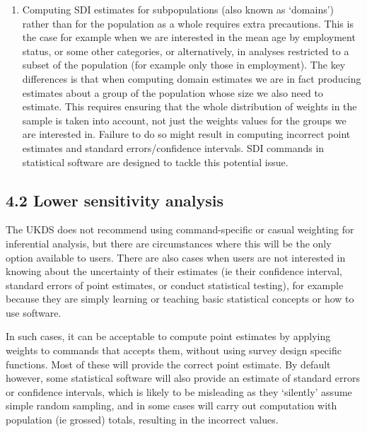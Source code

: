 \documentclass[
  14,
  a4paper,
  DIV=11,
  numbers=noendperiod]{scrartcl}
\providecommand{\tightlist}{%
  \setlength{\itemsep}{0pt}\setlength{\parskip}{0pt}}\usepackage{longtable,booktabs,array}
\begin{document}
\begin{enumerate}
\def\labelenumi{\arabic{enumi}.}
\setcounter{enumi}{3}
\tightlist
\item
  Computing SDI estimates for subpopulations (also known as `domains')
  rather than for the population as a whole requires extra precautions.
  This is the case for example when we are interested in the mean age by
  employment status, or some other categories, or alternatively, in
  analyses restricted to a subset of the population (for example only
  those in employment). The key differences is that when computing
  domain estimates we are in fact producing estimates about a group of
  the population whose size we also need to estimate. This requires
  ensuring that the whole distribution of weights in the sample is taken
  into account, not just the weights values for the groups we are
  interested in. Failure to do so might result in computing incorrect
  point estimates and standard errors/confidence intervals. SDI commands
  in statistical software are designed to tackle this potential issue.
\end{enumerate}

\hypertarget{lower-sensitivity-analysis}{%
\subsection{4.2 Lower sensitivity
analysis}\label{lower-sensitivity-analysis}}

The UKDS does not recommend using command-specific or casual weighting
for inferential analysis, but there are circumstances where this will be
the only option available to users. There are also cases when users are
not interested in knowing about the uncertainty of their estimates (ie
their confidence interval, standard errors of point estimates, or
conduct statistical testing), for example because they are simply
learning or teaching basic statistical concepts or how to use software.

In such cases, it can be acceptable to compute point estimates by
applying weights to commands that accepts them, without using survey
design specific functions. Most of these will provide the correct point
estimate. By default however, some statistical software will also
provide an estimate of standard errors or confidence intervals, which is
likely to be misleading as they `silently' assume simple random
sampling, and in some cases will carry out computation with population
(ie grossed) totals, resulting in the incorrect values.
\end{document}
